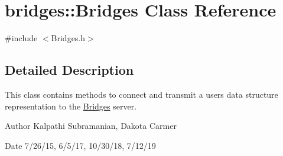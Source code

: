 \hypertarget{classbridges_1_1_bridges}{}\section{bridges\+:\+:Bridges Class Reference}
\label{classbridges_1_1_bridges}


{\ttfamily \#include $<$Bridges.\+h$>$}



\subsection{Detailed Description}
This class contains methods to connect and transmit a user\textquotesingle{}s data structure representation to the \hyperlink{classbridges_1_1_bridges}{Bridges} server. 

\begin{DoxyAuthor}{Author}
Kalpathi Subramanian, Dakota Carmer 
\end{DoxyAuthor}
\begin{DoxyDate}{Date}
7/26/15, 6/5/17, 10/30/18, 7/12/19 
\end{DoxyDate}
